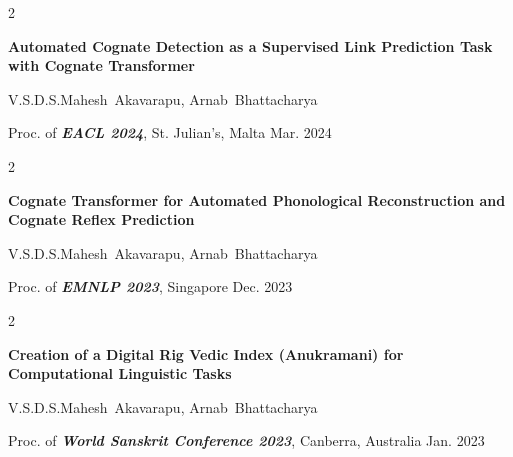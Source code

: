 \documentclass[10pt, letterpaper]{article}
\newenvironment{twocolentry}[2][]{
    \onecolentry
    \def\secondColumn{#2}
    \setcolumnwidth{\fill, 4.5 cm}
    \begin{paracol}{2}
}{
    \switchcolumn \raggedleft \secondColumn
    \end{paracol}
    \endonecolentry
} %
\begin{document}
        \vspace{0.2 cm}

        \begin{samepage}
            \begin{twocolentry}{
                Mar. 2024
            }
                \textbf{Automated Cognate Detection as a Supervised Link Prediction Task with Cognate Transformer}

                \vspace{0.10 cm}

                \mbox{V.S.D.S.Mahesh Akavarapu}, \mbox{Arnab Bhattacharya}
                \vspace{0.10 cm}

        Proc. of \textbf{\textit{EACL 2024}}, St. Julian's, Malta    \end{twocolentry}
        \end{samepage}

        \vspace{0.2 cm}

        \begin{samepage}
            \begin{twocolentry}{
                Dec. 2023
            }
                \textbf{Cognate Transformer for Automated Phonological Reconstruction and Cognate Reflex Prediction}

                \vspace{0.10 cm}

                \mbox{V.S.D.S.Mahesh Akavarapu}, \mbox{Arnab Bhattacharya}
                \vspace{0.10 cm}

        Proc. of \textbf{\textit{EMNLP 2023}}, Singapore    \end{twocolentry}
        \end{samepage}

        \vspace{0.2 cm}

        \begin{samepage}
            \begin{twocolentry}{
                Jan. 2023
            }
                \textbf{Creation of a Digital Rig Vedic Index (Anukramani) for Computational Linguistic Tasks}

                \vspace{0.10 cm}

                \mbox{V.S.D.S.Mahesh Akavarapu}, \mbox{Arnab Bhattacharya}
                \vspace{0.10 cm}

        Proc. of \textbf{\textit{World Sanskrit Conference 2023}}, Canberra, Australia    \end{twocolentry}
        \end{samepage}
\end{document}
